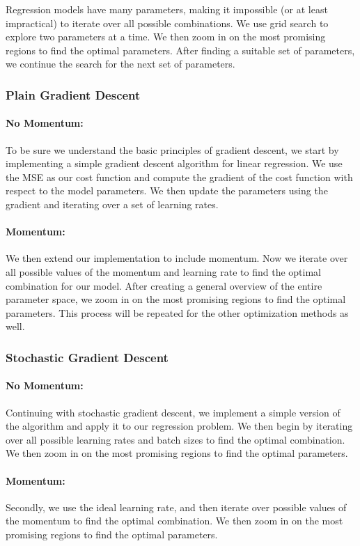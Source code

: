 \documentclass[aps,pra,english,notitlepage,reprint,nofootinbib]{revtex4-1}  %
\begin{document}
Regression models have many parameters, making it impossible (or at least impractical) to iterate over all possible combinations. We use grid search to explore two parameters at a time. We then zoom in on the most promising regions to find the optimal parameters. After finding a suitable set of parameters, we continue the search for the next set of parameters.

\subsubsection{Plain Gradient Descent}
\paragraph*{No Momentum:}
To be sure we understand the basic principles of gradient descent, we start by implementing a simple gradient descent algorithm for linear regression. We use the MSE as our cost function and compute the gradient of the cost function with respect to the model parameters. We then update the parameters using the gradient and iterating over a set of learning rates.
\paragraph*{Momentum:}
We then extend our implementation to include momentum. Now we iterate over all possible values of the momentum and learning rate to find the optimal combination for our model. After creating a general overview of the entire parameter space, we zoom in on the most promising regions to find the optimal parameters. This process will be repeated for the other optimization methods as well.

\subsubsection{Stochastic Gradient Descent}
\paragraph*{No Momentum:}
Continuing with stochastic gradient descent, we implement a simple version of the algorithm and apply it to our regression problem. We then begin by iterating over all possible learning rates and batch sizes to find the optimal combination. We then zoom in on the most promising regions to find the optimal parameters.
\paragraph*{Momentum:}
Secondly, we use the ideal learning rate, and then iterate over possible values of the momentum to find the optimal combination. We then zoom in on the most promising regions to find the optimal parameters.
\end{document}

